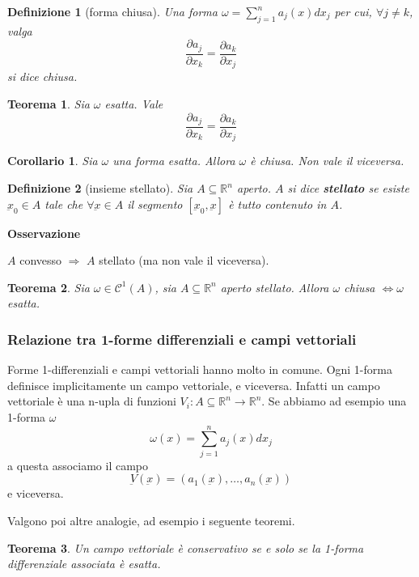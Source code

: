 \documentclass[a4paper,12pt]{article}
\newcommand{\cont}{\mathscr{C}}
\newtheorem{teo}{Teorema}
\newtheorem{defi}{Definizione}
\newtheorem{cor}{Corollario}
\begin{document}
\begin{defi}[forma chiusa]
 Una forma $\omega = \sum_{j=1}^n a_j(x)dx_j$ per cui, $\forall j\neq k$, valga
 $$\frac{\partial a_j}{\partial x_k} = \frac{\partial a_k}{\partial x_j} $$
 si dice chiusa.
\end{defi}

\begin{teo}
 Sia $\omega$ esatta. Vale
 $$\frac{\partial a_j}{\partial x_k} = \frac{\partial a_k}{\partial x_j} $$
\end{teo}

\begin{cor}
 Sia $\omega$ una forma esatta. Allora $\omega$ è chiusa. Non vale il viceversa.
\end{cor}

\begin{defi}[insieme stellato]
 Sia $A\subseteq\mathbb{R}^n$ aperto. $A$ si dice \textbf{stellato} se esiste $\underbar{x}_0\in A$ tale che
 $\forall \underbar{x} \in A$ il segmento $[\underbar{x}_0,\underbar{x}]$ è tutto contenuto in $A$.
\end{defi}
\textbf{Osservazione}

$A$ convesso $\Rightarrow$ $A$ stellato (ma non vale il viceversa).

\begin{teo}
Sia $\omega\in\cont^1(A)$, sia $A\subseteq \mathbb{R}^n$ aperto stellato. Allora $\omega$ chiusa $\Leftrightarrow\omega$ esatta.
\end{teo}

\subsubsection{Relazione tra 1-forme differenziali e campi vettoriali}

Forme 1-differenziali e campi vettoriali hanno molto in comune.
Ogni 1-forma definisce implicitamente un campo vettoriale, e viceversa. Infatti un campo vettoriale è una n-upla di funzioni $V_i:A\subseteq\mathbb{R}^n\rightarrow\mathbb{R}^n$.
Se abbiamo ad esempio una 1-forma $\omega$
$$\omega(x) = \sum_{j=1}^n a_j(x)dx_j$$
a questa associamo il campo
$$\underbar{V}(\underbar{x}) = (a_1(\underbar{x}), \dots, a_n(\underbar{x}))$$
e viceversa.

Valgono poi altre analogie, ad esempio i seguente teoremi.
\begin{teo}
Un campo vettoriale è conservativo se e solo se la 1-forma differenziale associata è esatta.
\end{teo}
\end{document}

